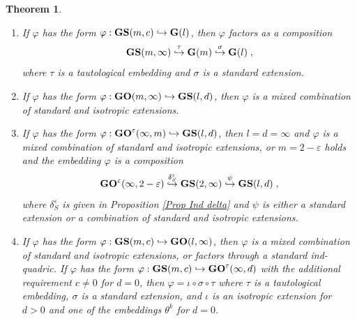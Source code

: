 \documentclass[12pt]{amsart}
\def\eps {\varepsilon}
\newtheorem{theorem}{Theorem}[section]
\begin{document}
\begin{theorem}
\begin{enumerate}
\item[\rm (iv)] If $\varphi$ has the form $\varphi:{\bf GS}(m,c)\hookrightarrow {\bf G}(l)$, then $\varphi$ factors as a composition
$$
{\bf GS}(m,\infty) \stackrel{\tau}{\hookrightarrow} {\bf G}(m) \stackrel{\sigma}{\hookrightarrow} {\bf G}(l) \;,
$$
where $\tau$ is a tautological embedding and $\sigma$ is a standard extension.

\item[\rm (v.1)] If $\varphi$ has the form $\varphi:{\bf GO}(m,\infty)\hookrightarrow {\bf GS}(l,d)$, then $\varphi$ is a mixed combination of standard and isotropic extensions.

\item[\rm (v.2)] If $\varphi$ has the form $\varphi:{\bf GO}^\eps(\infty,m)\hookrightarrow {\bf GS}(l,d)$, then $l=d=\infty$ and $\varphi$ is a mixed combination of standard and isotropic extensions, or $m=2-\eps$ holds and the embedding $\varphi$ is a composition
$$
{\bf GO}^\eps(\infty,2-\eps) \stackrel{\delta_S^\eps}{\hookrightarrow} {\bf GS}(2,\infty) \stackrel{\psi}{\hookrightarrow} {\bf GS}(l,d)\;,
$$
where $\delta_S^\eps$ is given in Proposition \ref{Prop Ind delta} and $\psi$ is either a standard extension or a combination of standard and isotropic extensions.

\item[\rm (vi)] If $\varphi$ has the form $\varphi:{\bf GS}(m,c)\hookrightarrow {\bf GO}(l,\infty)$, then $\varphi$ is a mixed combination of standard and isotropic extensions, or factors through a standard ind-quadric. If $\varphi$ has the form $\varphi:{\bf GS}(m,c)\hookrightarrow {\bf GO}^\eps(\infty,d)$ with the additional requirement $c\ne0$ for $d=0$, then $\varphi=\iota\circ\sigma\circ\tau$ where $\tau$ is a tautological embedding, $\sigma$ is a standard extension, and $\iota$ is an isotropic extension for $d>0$ and one of the embeddings $\theta^k$ for $d=0$.
\end{enumerate}
\end{theorem}
\end{document}
